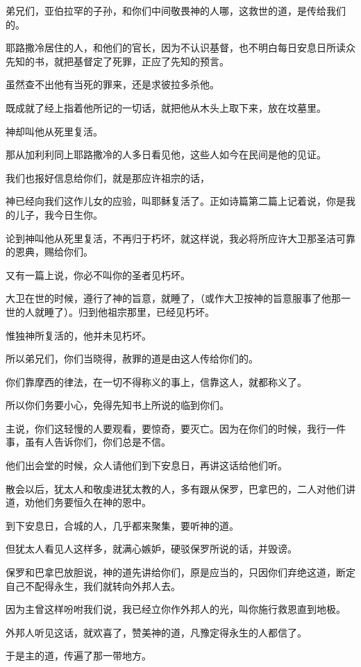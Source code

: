 \documentclass[12pt,oneside]{book}
\begin{document}
弟兄们，亚伯拉罕的子孙，和你们中间敬畏神的人哪，这救世的道，是传给我们的。

耶路撒冷居住的人，和他们的官长，因为不认识基督，也不明白每日安息日所读众先知的书，就把基督定了死罪，正应了先知的预言。

虽然查不出他有当死的罪来，还是求彼拉多杀他。

既成就了经上指着他所记的一切话，就把他从木头上取下来，放在坟墓里。

神却叫他从死里复活。

那从加利利同上耶路撒冷的人多日看见他，这些人如今在民间是他的见证。

我们也报好信息给你们，就是那应许祖宗的话，

神已经向我们这作儿女的应验，叫耶稣复活了。正如诗篇第二篇上记着说，你是我的儿子，我今日生你。

论到神叫他从死里复活，不再归于朽坏，就这样说，我必将所应许大卫那圣洁可靠的恩典，赐给你们。

又有一篇上说，你必不叫你的圣者见朽坏。

大卫在世的时候，遵行了神的旨意，就睡了，（或作大卫按神的旨意服事了他那一世的人就睡了）。归到他祖宗那里，已经见朽坏。

惟独神所复活的，他并未见朽坏。

所以弟兄们，你们当晓得，赦罪的道是由这人传给你们的。

你们靠摩西的律法，在一切不得称义的事上，信靠这人，就都称义了。

所以你们务要小心，免得先知书上所说的临到你们。

主说，你们这轻慢的人要观看，要惊奇，要灭亡。因为在你们的时候，我行一件事，虽有人告诉你们，你们总是不信。

他们出会堂的时候，众人请他们到下安息日，再讲这话给他们听。

散会以后，犹太人和敬虔进犹太教的人，多有跟从保罗，巴拿巴的，二人对他们讲道，劝他们务要恒久在神的恩中。

到下安息日，合城的人，几乎都来聚集，要听神的道。

但犹太人看见人这样多，就满心嫉妒，硬驳保罗所说的话，并毁谤。

保罗和巴拿巴放胆说，神的道先讲给你们，原是应当的，只因你们弃绝这道，断定自己不配得永生，我们就转向外邦人去。

因为主曾这样吩咐我们说，我已经立你作外邦人的光，叫你施行救恩直到地极。

外邦人听见这话，就欢喜了，赞美神的道，凡豫定得永生的人都信了。

于是主的道，传遍了那一带地方。
\end{document}

